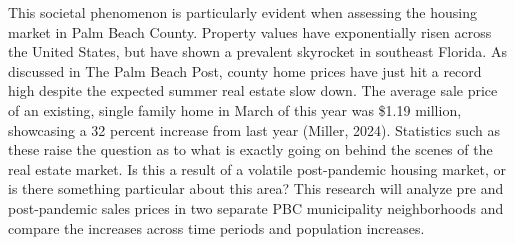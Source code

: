 \documentclass[12pt,english]{article}
\begin{document}
This societal phenomenon is particularly evident when assessing the housing market in Palm Beach County. Property values have exponentially risen across the United States, but have shown a prevalent skyrocket in southeast Florida. As discussed in The Palm Beach Post, county home prices have just hit a record high despite the expected summer real estate slow down. The average sale price of an existing, single family home in March of this year was \$1.19 million, showcasing a 32 percent increase from last year (Miller, 2024). Statistics such as these raise the question as to what is exactly going on behind the scenes of the real estate market. Is this a result of a volatile post-pandemic housing market, or is there something particular about this area? This research will analyze pre and post-pandemic sales prices in two separate PBC municipality neighborhoods and compare the increases across time periods and population increases. 
\end{document}
